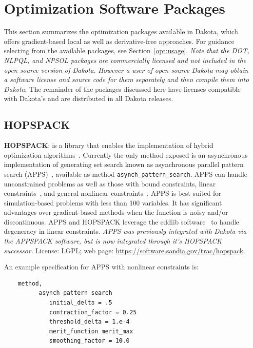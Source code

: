 \section{Optimization Software Packages}\label{opt:software}

This section summarizes the optimization packages available in Dakota,
which offers gradient-based local as well as derivative-free
approaches.  For guidance selecting from the available packages, see
Section~\ref{opt:usage}.  {\em Note that the DOT, NLPQL, and NPSOL
  packages are commercially licensed and not included in the open
  source version of Dakota.  However a user of open source Dakota may
  obtain a software license and source code for them separately and
  then compile them into Dakota.}  The remainder of the packages
discussed here have licenses compatible with Dakota's and are
distributed in all Dakota releases.

\subsection{HOPSPACK}\label{opt:software:hopspack}

\textbf{HOPSPACK}: is a library that enables the implementation of
hybrid optimization algorithms~\cite{Plantenga2009}.  Currently the
only method exposed is an asynchronous implementation of generating
set search known as asynchronous parallel pattern search
(APPS)~\cite{GrKo06}, available as method
\texttt{asynch\_pattern\_search}.  APPS can handle unconstrained
problems as well as those with bound constraints, linear
constraints~\cite{GrKoLe08}, and general nonlinear
constraints~\cite{GrKo07}.  APPS is best suited for simulation-based
problems with less than 100 variables.  It has significant advantages
over gradient-based methods when the function is noisy and/or
discontinuous.  APPS and HOPSPACK leverage the cddlib
software~\cite{Fu05} to handle degeneracy in linear constraints.  {\em
  APPS was previously integrated with Dakota via the APPSPACK
  software, but is now integrated through it's HOPSPACK successor.}
License: LGPL; web page: \url{https://software.sandia.gov/trac/hopspack}.

An example specification for APPS with nonlinear constraints is:
\begin{small}
\begin{verbatim}
    method,
          asynch_pattern_search
             initial_delta = .5
             contraction_factor = 0.25
             threshold_delta = 1.e-4
             merit_function merit_max
             smoothing_factor = 10.0
\end{verbatim}
\end{small} %

